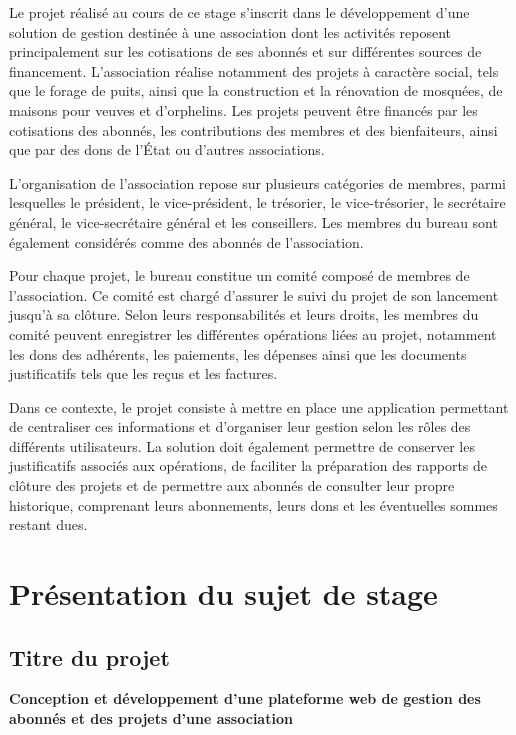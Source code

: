 Le projet réalisé au cours de ce stage s'inscrit dans le développement d'une solution de gestion destinée à une association dont les activités reposent principalement sur les cotisations de ses abonnés et sur différentes sources de financement. L'association réalise notamment des projets à caractère social, tels que le forage de puits, ainsi que la construction et la rénovation de mosquées, de maisons pour veuves et d'orphelins. Les projets peuvent être financés par les cotisations des abonnés, les contributions des membres et des bienfaiteurs, ainsi que par des dons de l'État ou d'autres associations.

L'organisation de l'association repose sur plusieurs catégories de membres, parmi lesquelles le président, le vice-président, le trésorier, le vice-trésorier, le secrétaire général, le vice-secrétaire général et les conseillers. Les membres du bureau sont également considérés comme des abonnés de l'association.

Pour chaque projet, le bureau constitue un comité composé de membres de l'association. Ce comité est chargé d'assurer le suivi du projet de son lancement jusqu'à sa clôture. Selon leurs responsabilités et leurs droits, les membres du comité peuvent enregistrer les différentes opérations liées au projet, notamment les dons des adhérents, les paiements, les dépenses ainsi que les documents justificatifs tels que les reçus et les factures.

Dans ce contexte, le projet consiste à mettre en place une application permettant de centraliser ces informations et d'organiser leur gestion selon les rôles des différents utilisateurs. La solution doit également permettre de conserver les justificatifs associés aux opérations, de faciliter la préparation des rapports de clôture des projets et de permettre aux abonnés de consulter leur propre historique, comprenant leurs abonnements, leurs dons et les éventuelles sommes restant dues.

\section{Présentation du sujet de stage}

\subsection{Titre du projet}

\textbf{Conception et développement d'une plateforme web de gestion des abonnés et des projets d'une association}


